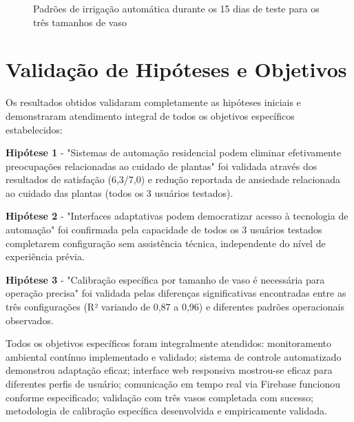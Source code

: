 \documentclass[twoside,english,brazilian]{UNISINOSmonografia}
\begin{document}
\begin{figure}[htbp]
\centering
\caption{Padrões de irrigação automática durante os 15 dias de teste para os três tamanhos de vaso}
\label{fig:padroes_irrigacao}
\end{figure}

\section{Validação de Hipóteses e Objetivos}

Os resultados obtidos validaram completamente as hipóteses iniciais e demonstraram atendimento integral de todos os objetivos específicos estabelecidos:

\textbf{Hipótese 1} - "Sistemas de automação residencial podem eliminar efetivamente preocupações relacionadas ao cuidado de plantas" foi validada através dos resultados de satisfação (6,3/7,0) e redução reportada de ansiedade relacionada ao cuidado das plantas (todos os 3 usuários testados).

\textbf{Hipótese 2} - "Interfaces adaptativas podem democratizar acesso à tecnologia de automação" foi confirmada pela capacidade de todos os 3 usuários testados completarem configuração sem assistência técnica, independente do nível de experiência prévia.

\textbf{Hipótese 3} - "Calibração específica por tamanho de vaso é necessária para operação precisa" foi validada pelas diferenças significativas encontradas entre as três configurações (R² variando de 0,87 a 0,96) e diferentes padrões operacionais observados.

Todos os objetivos específicos foram integralmente atendidos: monitoramento ambiental contínuo implementado e validado; sistema de controle automatizado demonstrou adaptação eficaz; interface web responsiva mostrou-se eficaz para diferentes perfis de usuário; comunicação em tempo real via Firebase funcionou conforme especificado; validação com três vasos completada com sucesso; metodologia de calibração específica desenvolvida e empiricamente validada.
\end{document}
